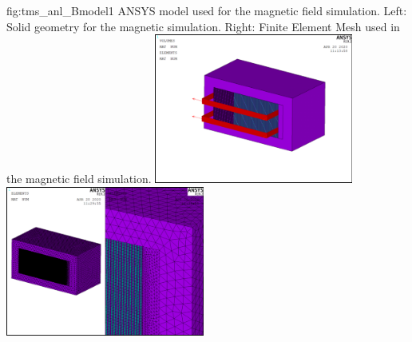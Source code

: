 \fi

\begin{dunefigure}{fig:tms_anl_Bmodel1}
{ANSYS model used for the magnetic field simulation.  Left:  Solid geometry for the magnetic simulation.  Right:  Finite Element Mesh used in the magnetic field simulation.   }
\includegraphics[width=0.49\textwidth]{graphics/tms/Detector/tms_anl_Bmodel1.pdf} \includegraphics[width=0.49\textwidth]{graphics/tms/Detector/tms_anl_Bmodel2.pdf}
\end{dunefigure}

